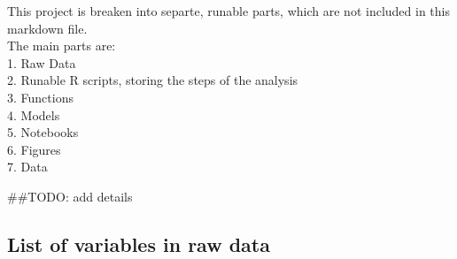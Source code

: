 \documentclass[]{article}
\begin{document}
This project is breaken into separte, runable parts, which are not
included in this markdown file.\\
The main parts are:\\
1. Raw Data\\
2. Runable R scripts, storing the steps of the analysis\\
3. Functions\\
4. Models\\
5. Notebooks\\
6. Figures\\
7. Data

{\#\#TODO: add details}

\subsection{List of variables in raw
data}\label{list-of-variables-in-raw-data}
\end{document}
